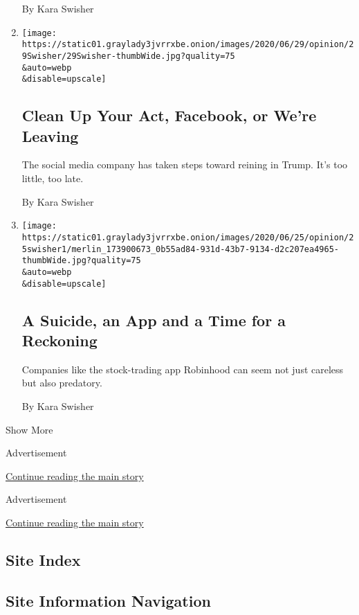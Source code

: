 \begin{enumerate}
  By Kara Swisher
\item
  \href{/2020/06/30/opinion/facebook-zuckerberg-labeling.html}{}

  \texttt{[image: https://static01.graylady3jvrrxbe.onion/images/2020/06/29/opinion/29Swisher/29Swisher-thumbWide.jpg?quality=75\\\&auto=webp\\\&disable=upscale]}

  \hypertarget{clean-up-your-act-facebook-or-were-leaving}{%
  \subsection{Clean Up Your Act, Facebook, or We're
  Leaving}\label{clean-up-your-act-facebook-or-were-leaving}}

  The social media company has taken steps toward reining in Trump. It's
  too little, too late.

  By Kara Swisher
\item
  \href{/2020/06/25/opinion/robinhood-suicide-trading.html}{}

  \texttt{[image: https://static01.graylady3jvrrxbe.onion/images/2020/06/25/opinion/25swisher1/merlin\_173900673\_0b55ad84-931d-43b7-9134-d2c207ea4965-thumbWide.jpg?quality=75\\\&auto=webp\\\&disable=upscale]}

  \hypertarget{a-suicide-an-app-and-a-time-for-a-reckoning}{%
  \subsection{A Suicide, an App and a Time for a
  Reckoning}\label{a-suicide-an-app-and-a-time-for-a-reckoning}}

  Companies like the stock-trading app Robinhood can seem not just
  careless but also predatory.

  By Kara Swisher
\end{enumerate}

Show More

Advertisement

\protect\hyperlink{after-mid1}{Continue reading the main story}

Advertisement

\protect\hyperlink{after-mktg}{Continue reading the main story}

\hypertarget{site-index}{%
\subsection{Site Index}\label{site-index}}

\hypertarget{site-information-navigation}{%
\subsection{Site Information
Navigation}\label{site-information-navigation}}

